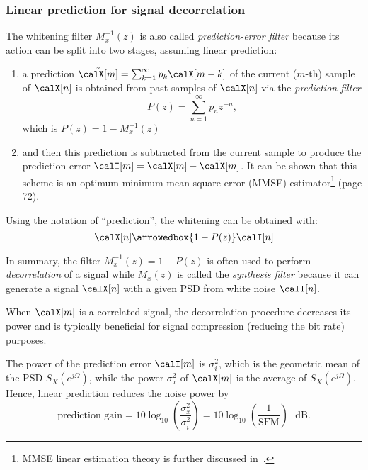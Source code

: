 \subsubsection{Linear prediction for signal decorrelation}

The whitening filter $M_x^{-1}(z)$ is also called \emph{prediction-error filter} because its action can be split into two stages, assuming linear prediction:
\begin{enumerate}
	\item a prediction $\tilde \calX[m] = \sum_{k=1}^{\infty} p_k \calX[m-k]$ of the current ($m$-th) sample of $\calX[n]$ is obtained from past samples of $\calX[n]$ via the \emph{prediction filter} 
	\begin{equation}
	P(z) = \sum_{n=1}^{\infty} p_n z^{-n},
	\end{equation}
	which is $P(z) = 1 - M_x^{-1}(z)$
	\item and then this prediction is subtracted from the current sample to produce the prediction error $\calI[m] = \calX[m] - \tilde \calX[m]$. It can be shown that this scheme is an optimum minimum mean square error (MMSE) estimator\footnote{MMSE linear estimation theory is further discussed in~\cite{Cioffi97}.}
 \cite{Barry04} (page 72).
\end{enumerate}

Using the notation of ``prediction'', the whitening can be obtained with:
\[
\calX[n] \arrowedbox{1-P(z)} \calI[n]
\]

In summary, the filter $M_x^{-1}(z) = 1 - P(z)$ is often used to perform \emph{decorrelation} of a signal while $M_x(z)$ is called the \emph{synthesis filter} because it can generate a signal $\calX[n]$ with a given PSD from white noise $\calI[n]$.
	
When $\calX[m]$ is a correlated signal, the decorrelation procedure decreases its power and is typically beneficial for signal compression (reducing the bit rate) purposes.

The power of the prediction error $\calI[m]$ is $\sigma_i^2$, which is the geometric mean of the PSD $S_X(e^{j \Omega})$,  while the power $\sigma_x^2$ of $\calX[m]$ is the average of $S_X(e^{j \Omega})$. Hence, linear prediction reduces the noise power by
\begin{equation}
\textrm{prediction gain} = 10 \log_{10} \left( \frac{\sigma_x^2}{\sigma_i^2} \right) = 10 \log_{10} \left( \frac{1}{\textrm{SFM}} \right)~~~\textrm{dB}.
\label{eq:predictionGain}
\end{equation}

